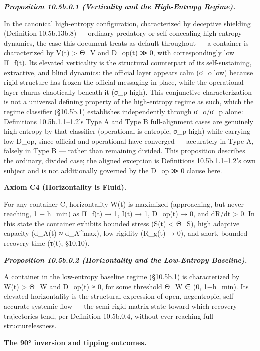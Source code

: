\documentclass[
]{article}
\begin{document}
\emph{\textbf{Proposition 10.5b.0.1 (Verticality and the High-Entropy
Regime).}}

In the canonical high-entropy configuration, characterized by deceptive
shielding (Definition 10.5b.13b.8) ---
ordinary predatory or self-concealing high-entropy dynamics, the case
this document treats as default throughout --- a container is
characterized by V(t) \textgreater{} Θ\_V and D\_op(t) ≫ 0, with
correspondingly low Π\_f(t). Its elevated verticality is the structural
counterpart of its self-sustaining, extractive, and blind dynamics: the
official layer appears calm (σ\_o low) because rigid structure has
frozen the official messaging in place, while the operational layer
churns chaotically beneath it (σ\_p high). This conjunctive
characterization is not a universal defining property of the
high-entropy regime as such, which the regime classifier (§10.5b.1)
establishes independently through σ\_o/σ\_p alone: Definitions
10.5b.1.1--1.2's Type A and Type B full-alignment cases are genuinely
high-entropy by that classifier (operational is entropic, σ\_p high)
while carrying low D\_op, since official and operational have converged
--- accurately in Type A, falsely in Type B --- rather than remaining
divided. This proposition describes the ordinary, divided case; the
aligned exception is Definitions 10.5b.1.1--1.2's own subject and is not
additionally governed by the D\_op ≫ 0 clause here.

\textbf{Axiom C4 (Horizontality is Fluid).}

For any container C, horizontality W(t) is maximized (approaching, but
never reaching, 1 − h\_min) as Π\_f(t) → 1, I(t) → 1, D\_op(t) → 0, and
dR/dt \textgreater{} 0. In this state the container exhibits bounded
stress (S(t) \textless{} Θ\_S), high adaptive capacity (d\_A(t) ≈
d\_A\^{}max), low rigidity (R\_g(t) → 0), and short, bounded recovery
time (τ(t), §10.10).

\emph{\textbf{Proposition 10.5b.0.2 (Horizontality and the Low-Entropy
Baseline).}}

A container in the low-entropy baseline regime (§10.5b.1) is
characterized by W(t) \textgreater{} Θ\_W and D\_op(t) ≈ 0, for some
threshold Θ\_W ∈ (0, 1−h\_min). Its elevated horizontality is the
structural expression of open, negentropic, self-accurate systemic flow ---
the semi-rigid matrix state toward which recovery trajectories tend, per
Definition 10.5b.0.4, without ever reaching full structurelessness.

\textbf{The 90° inversion and tipping outcomes.}
\end{document}
